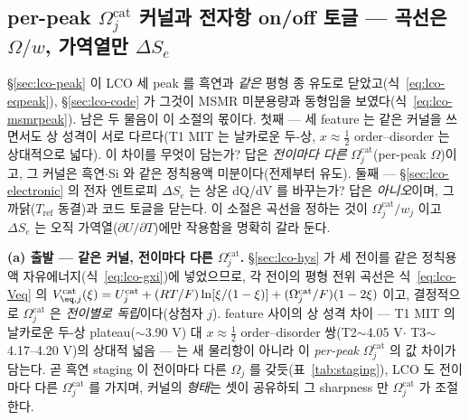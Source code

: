 \subsection{per-peak $\Omega_j^\mathrm{cat}$ 커널과 전자항 on/off 토글 --- 곡선은 $\Omega/w$, 가역열만 $\Delta S_e$}\label{ssec:lco-perpeak}
\S\ref{sec:lco-peak} 이 LCO 세 peak 를 흑연과 \emph{같은} 평형 종 유도로 닫았고(식~\eqref{eq:lco-eqpeak}),
\S\ref{sec:lco-code} 가 그것이 MSMR 미분용량과 동형임을 보였다(식~\eqref{eq:lco-msmrpeak}). 남은 두 물음이
이 소절의 몫이다. 첫째 --- 세 feature 는 같은 커널을 쓰면서도 상 성격이 서로 다르다(T1 MIT 는 날카로운 두-상,
$x\!\approx\!\tfrac12$ order--disorder 는 상대적으로 넓다). 이 차이를 무엇이 담는가? 답은 \emph{전이마다 다른}
$\Omega_j^\mathrm{cat}$(per-peak $\Omega$)이고, 그 커널은 흑연$\cdot$Si 와 같은 정칙용액 미분이다(전제부터
유도). 둘째 --- \S\ref{sec:lco-electronic} 의 전자 엔트로피 $\Delta S_e$ 는 상온 dQ/dV 를 바꾸는가? 답은
\emph{아니오}이며, 그 까닭($T_\mathrm{ref}$ 동결)과 코드 토글을 닫는다. 이 소절은 곡선을 정하는 것이
$\Omega_j^\mathrm{cat}/w_j$ 이고 $\Delta S_e$ 는 오직 가역열($\partial U/\partial T$)에만 작용함을 명확히 갈라
둔다.

\textbf{(a) 출발 --- 같은 커널, 전이마다 다른 $\Omega_j^\mathrm{cat}$.} \S\ref{sec:lco-hys} 가 세 전이를 같은
정칙용액 자유에너지(식~\eqref{eq:lco-gxi})에 넣었으므로, 각 전이의 평형 전위 곡선은 식~\eqref{eq:lco-Veq} 의
$V_{\eq,j}^\mathrm{cat}(\xi)=U_j^\mathrm{cat}+(RT/F)\ln[\xi/(1-\xi)]+(\Omega_j^\mathrm{cat}/F)(1-2\xi)$ 이고,
결정적으로 $\Omega_j^\mathrm{cat}$ 은 \emph{전이별로 독립}이다(상첨자 $j$). feature 사이의 상 성격 차이 --- T1
MIT 의 날카로운 두-상 plateau($\sim$3.90 V) 대 $x\!\approx\!\tfrac12$ order--disorder 쌍(T2$\sim$4.05 V$\cdot$%
T3$\sim$4.17--4.20 V)의 상대적 넓음 --- 는 새 물리항이 아니라 이 \emph{per-peak} $\Omega_j^\mathrm{cat}$ 의
값 차이가 담는다. 곧 흑연 staging 이 전이마다 다른 $\Omega_j$ 를 갖듯(표~\ref{tab:staging}), LCO 도 전이마다
다른 $\Omega_j^\mathrm{cat}$ 를 가지며, 커널의 \emph{형태}는 셋이 공유하되 그 sharpness 만 $\Omega_j^\mathrm{cat}$
가 조절한다.

